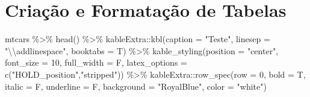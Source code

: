 \documentclass[
  12pt,
  a4paper,
]{article}
\newenvironment{Shaded}{\begin{snugshade}}{\end{snugshade}}
\newcommand{\AttributeTok}[1]{\textcolor[rgb]{0.77,0.63,0.00}{#1}}
\newcommand{\DecValTok}[1]{\textcolor[rgb]{0.00,0.00,0.81}{#1}}
\newcommand{\FunctionTok}[1]{\textcolor[rgb]{0.00,0.00,0.00}{#1}}
\newcommand{\NormalTok}[1]{#1}
\newcommand{\SpecialCharTok}[1]{\textcolor[rgb]{0.00,0.00,0.00}{#1}}
\newcommand{\StringTok}[1]{\textcolor[rgb]{0.31,0.60,0.02}{#1}}
\begin{document}
\hypertarget{criauxe7uxe3o-e-formatauxe7uxe3o-de-tabelas}{%
\section{Criação e Formatação de Tabelas}\label{criauxe7uxe3o-e-formatauxe7uxe3o-de-tabelas}}

\begin{Shaded}
\begin{Highlighting}[]
\NormalTok{mtcars }\SpecialCharTok{\%\textgreater{}\%} 
  \FunctionTok{head}\NormalTok{() }\SpecialCharTok{\%\textgreater{}\%} 
\NormalTok{  kableExtra}\SpecialCharTok{::}\FunctionTok{kbl}\NormalTok{(}\AttributeTok{caption =} \StringTok{"Teste"}\NormalTok{,}
                  \AttributeTok{linesep =} \StringTok{"}\SpecialCharTok{\textbackslash{}\textbackslash{}}\StringTok{addlinespace"}\NormalTok{,}
                  \AttributeTok{booktabs =}\NormalTok{ T) }\SpecialCharTok{\%\textgreater{}\%} 
  \FunctionTok{kable\_styling}\NormalTok{(}\AttributeTok{position =} \StringTok{"center"}\NormalTok{,}
                \AttributeTok{font\_size =} \DecValTok{10}\NormalTok{,}
                \AttributeTok{full\_width =}\NormalTok{ F,}
                \AttributeTok{latex\_options =} \FunctionTok{c}\NormalTok{(}\StringTok{"HOLD\_position"}\NormalTok{,}\StringTok{"stripped"}\NormalTok{)) }\SpecialCharTok{\%\textgreater{}\%} 
\NormalTok{  kableExtra}\SpecialCharTok{::}\FunctionTok{row\_spec}\NormalTok{(}\AttributeTok{row =} \DecValTok{0}\NormalTok{, }
                       \AttributeTok{bold =}\NormalTok{ T,}
                       \AttributeTok{italic =}\NormalTok{ F,}
                       \AttributeTok{underline =}\NormalTok{ F,}
                       \AttributeTok{background =} \StringTok{"RoyalBlue"}\NormalTok{,}
                       \AttributeTok{color =} \StringTok{"white"}\NormalTok{)}
\end{Highlighting}
\end{Shaded}
\end{document}
